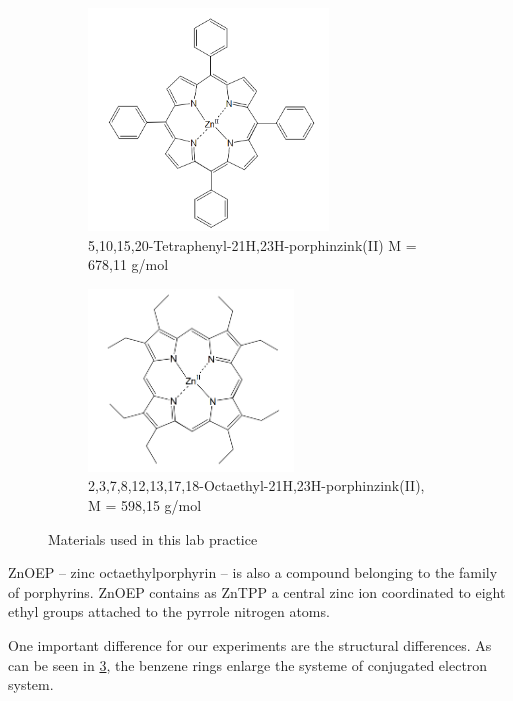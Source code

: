 \begin{figure}[h]
    \centering
    \begin{subfigure}[b]{0.5\textwidth}
        \centering
        \includegraphics[width =0.7\textwidth]{Bilder/Grundlagen/ZnTPP.png}      
        \caption{5,10,15,20-Tetraphenyl-21H,23H-porphinzink(II) \newline M = 678,11 g/mol}
      \label{fig:ZnTPP}
    \end{subfigure}
    \hspace{\fill}
    \begin{subfigure}[b]{0.3\textwidth}
      \centering
      \includegraphics[width = 0.6\textwidth]{Bilder/Grundlagen/ZnOEP.png}      
      \caption{2,3,7,8,12,13,17,18-Octaethyl-21H,23H-porphinzink(II), M = 598,15 g/mol}
      \label{fig:ZnOEP}
    \end{subfigure}
    \caption{Materials used in this lab practice}
    \label{fig:Polymere}
\end{figure}

ZnOEP -- zinc octaethylporphyrin -- is also a compound belonging to the family of porphyrins. ZnOEP contains as ZnTPP a central zinc ion
coordinated to eight ethyl groups attached to the pyrrole nitrogen atoms.

One important difference for our experiments are the structural differences. As can be seen in \cref{fig:Polymere}, the benzene rings enlarge the systeme of conjugated electron system. 

